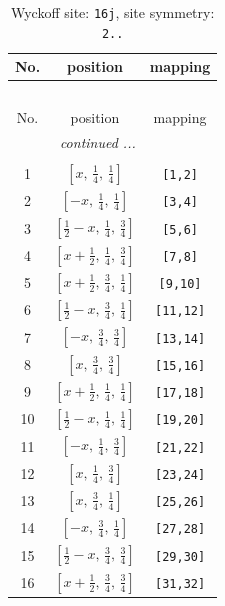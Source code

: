\documentclass[fleqn,8pt]{jsarticle}
\begin{document}
\renewcommand{\arraystretch}{1.2}
\begin{longtable}{ccc}
\caption{Wyckoff site: {\tt 16j}, site symmetry: {\tt 2..}}
 \\
 \hline \hline
No. & position & mapping \\ \hline \endfirsthead

\multicolumn{2}{l}{\tablename\ \thetable{}} \\
 \hline \hline
No. & position & mapping \\ \hline \endhead

 \hline \hline
\multicolumn{2}{r}{\footnotesize\it continued ...} \\ \endfoot

 \hline \hline
\multicolumn{2}{r}{} \\ \endlastfoot

1 & $\left[ x,\, \frac{1}{4},\, \frac{1}{4} \right]$ & {\tt [1,2]} \\ \hline
2 & $\left[ - x,\, \frac{1}{4},\, \frac{1}{4} \right]$ & {\tt [3,4]} \\ \hline
3 & $\left[ \frac{1}{2} - x,\, \frac{1}{4},\, \frac{3}{4} \right]$ & {\tt [5,6]} \\ \hline
4 & $\left[ x + \frac{1}{2},\, \frac{1}{4},\, \frac{3}{4} \right]$ & {\tt [7,8]} \\ \hline
5 & $\left[ x + \frac{1}{2},\, \frac{3}{4},\, \frac{1}{4} \right]$ & {\tt [9,10]} \\ \hline
6 & $\left[ \frac{1}{2} - x,\, \frac{3}{4},\, \frac{1}{4} \right]$ & {\tt [11,12]} \\ \hline
7 & $\left[ - x,\, \frac{3}{4},\, \frac{3}{4} \right]$ & {\tt [13,14]} \\ \hline
8 & $\left[ x,\, \frac{3}{4},\, \frac{3}{4} \right]$ & {\tt [15,16]} \\ \hline
9 & $\left[ x + \frac{1}{2},\, \frac{1}{4},\, \frac{1}{4} \right]$ & {\tt [17,18]} \\ \hline
10 & $\left[ \frac{1}{2} - x,\, \frac{1}{4},\, \frac{1}{4} \right]$ & {\tt [19,20]} \\ \hline
11 & $\left[ - x,\, \frac{1}{4},\, \frac{3}{4} \right]$ & {\tt [21,22]} \\ \hline
12 & $\left[ x,\, \frac{1}{4},\, \frac{3}{4} \right]$ & {\tt [23,24]} \\ \hline
13 & $\left[ x,\, \frac{3}{4},\, \frac{1}{4} \right]$ & {\tt [25,26]} \\ \hline
14 & $\left[ - x,\, \frac{3}{4},\, \frac{1}{4} \right]$ & {\tt [27,28]} \\ \hline
15 & $\left[ \frac{1}{2} - x,\, \frac{3}{4},\, \frac{3}{4} \right]$ & {\tt [29,30]} \\ \hline
16 & $\left[ x + \frac{1}{2},\, \frac{3}{4},\, \frac{3}{4} \right]$ & {\tt [31,32]} \\
\end{longtable}
\end{document}
